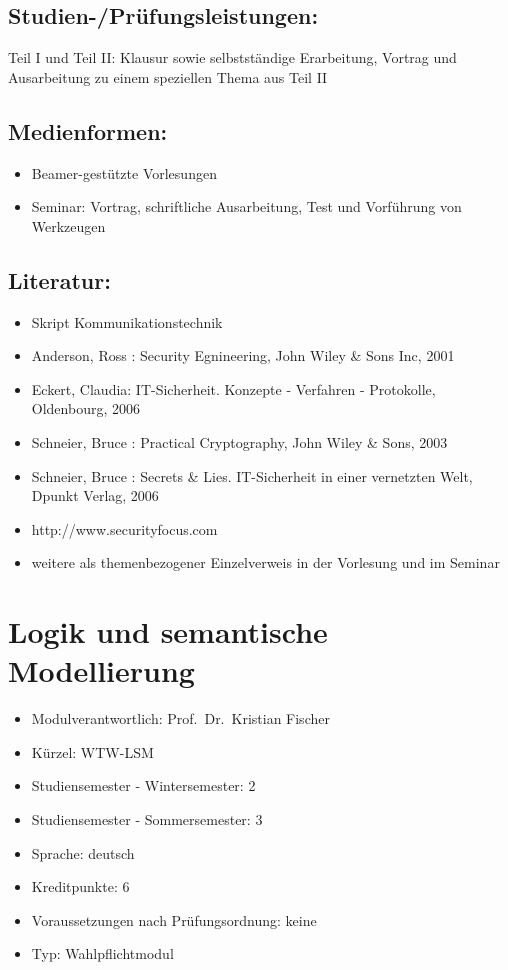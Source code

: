 \section*{Studien-/Prüfungsleistungen:}\label{studien-pruxfcfungsleistungen-19}

Teil I und Teil II: Klausur sowie selbstständige Erarbeitung, Vortrag
und Ausarbeitung zu einem speziellen Thema aus Teil II

\section*{Medienformen:}\label{medienformen-19}

\begin{itemize}
\tightlist
\item
  Beamer-gestützte Vorlesungen
\item
  Seminar: Vortrag, schriftliche Ausarbeitung, Test und Vorführung von
  Werkzeugen
\end{itemize}

\section*{Literatur:}\label{literatur-16}

\begin{itemize}
\tightlist
\item
  Skript Kommunikationstechnik
\item
  Anderson, Ross : Security Egnineering, John Wiley \& Sons Inc, 2001
\item
  Eckert, Claudia: IT-Sicherheit. Konzepte - Verfahren - Protokolle,
  Oldenbourg, 2006
\item
  Schneier, Bruce : Practical Cryptography, John Wiley \& Sons, 2003
\item
  Schneier, Bruce : Secrets \& Lies. IT-Sicherheit in einer vernetzten
  Welt, Dpunkt Verlag, 2006
\item
  http://www.securityfocus.com
\item
  weitere als themenbezogener Einzelverweis in der Vorlesung und im
  Seminar
\end{itemize}

\chapter{Logik und semantische
Modellierung}\label{logik-und-semantische-modellierung}

\begin{itemize}
\tightlist
\item
  Modulverantwortlich: Prof.~Dr.~Kristian Fischer
\item
  Kürzel: WTW-LSM
\item
  Studiensemester - Wintersemester: 2
\item
  Studiensemester - Sommersemester: 3
\item
  Sprache: deutsch
\item
  Kreditpunkte: 6
\item
  Voraussetzungen nach Prüfungsordnung: keine
\item
  Typ: Wahlpflichtmodul
\end{itemize}

